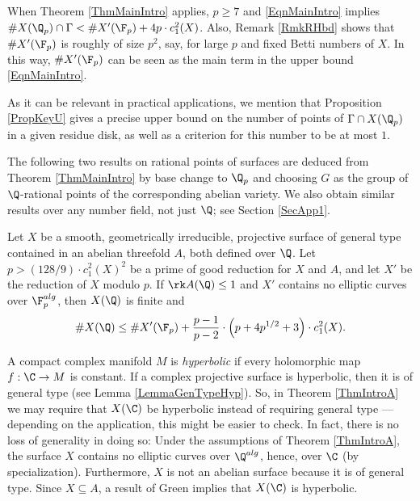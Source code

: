 \begin{remark}
\notready\label{RmkRH4p} When Theorem \ref{ThmMainIntro} applies, $p\ge 7$ and \eqref{EqnMainIntro} implies $ \# X(\Q_p)\cap \Gamma< \# X'(\F_p) + 4p\cdot c_1^2(X)$. Also, Remark \ref{RmkRHbd} shows  that $\# X'(\F_p)$ is roughly of size $p^2$, say, for large $p$ and fixed Betti numbers of $X$. In this way, $\# X'(\F_p)$ can be seen as the main term in the upper bound \eqref{EqnMainIntro}.
\end{remark}
\begin{remark}
\notready As it can be relevant in practical applications, we mention that Proposition \ref{PropKeyU} gives a precise upper bound on the number of points of $\Gamma\cap X(\Q_p)$ in a given residue disk, as well as a criterion for this number to be at most $1$.
\end{remark}

The following two results on rational points of surfaces are deduced from Theorem \ref{ThmMainIntro} by base change to $\Q_p$ and choosing $G$ as the group of $\Q$-rational points of the corresponding abelian variety. We also obtain similar results over any number field, not just $\Q$; see Section \ref{SecApp1}.
\begin{theorem}
\notready\label{ThmIntroA} Let $X$ be a smooth, geometrically irreducible, projective surface of general type contained in an abelian threefold $A$, both defined over $\Q$. Let $p> (128/9)\cdot  c_1^2(X)^2$ be a prime of good reduction for $X$ and $A$, and let $X'$ be the reduction of $X$ modulo $p$.  If $\rk A(\Q)\le 1$ and $X'$ contains no elliptic curves over $\F_p^{alg}$, then $X(\Q)$ is finite and
$$
\#X(\Q) \le \# X'(\F_p) + \frac{p-1}{p-2}\cdot \left(p+4p^{1/2} + 3\right)\cdot c_1^2(X).
$$
\end{theorem}
\begin{remark}
\notready\label{RmkHyp1} A compact complex manifold $M$ is \emph{hyperbolic} if every holomorphic map $f:\C\to M$ is constant. If a complex projective surface is hyperbolic, then it is of general type (see Lemma \ref{LemmaGenTypeHyp}). So, in Theorem \ref{ThmIntroA} we may require that $X(\C)$ be hyperbolic instead of requiring general type ---depending on the application, this might be easier to check. In fact, there is no loss of generality in doing so: Under the assumptions of Theorem \ref{ThmIntroA}, the surface $X$ contains no elliptic curves over $\Q^{alg}$, hence, over  $\C$ (by specialization). Furthermore, $X$ is not an abelian surface because it is of general type. Since $X\subseteq A$, a result of Green \cite{Green} implies that $X(\C)$ is hyperbolic.
\end{remark}


